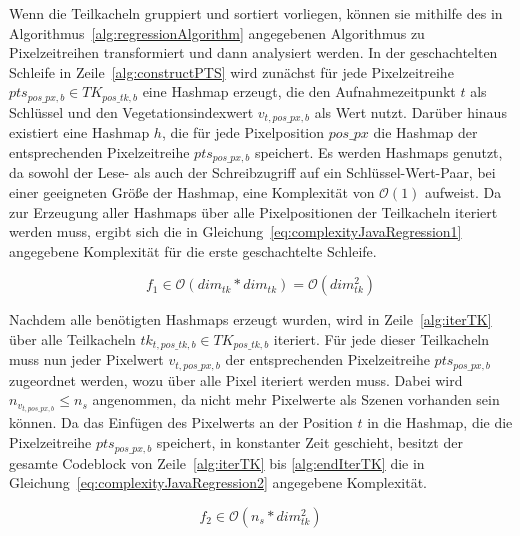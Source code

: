 Wenn die Teilkacheln gruppiert und sortiert vorliegen, können sie mithilfe des in Algorithmus~\ref{alg:regressionAlgorithm} angegebenen Algorithmus zu Pixelzeitreihen transformiert und dann analysiert werden. In der geschachtelten Schleife in Zeile~\ref{alg:constructPTS} wird zunächst für jede Pixelzeitreihe $pts_{pos\_px, b} \in TK_{pos\_tk, b}$ eine Hashmap erzeugt, die den Aufnahmezeitpunkt $t$ als Schlüssel und den Vegetationsindexwert $v_{t, pos\_px, b}$ als Wert nutzt. Darüber hinaus existiert eine Hashmap $h$, die für jede Pixelposition $pos\_px$ die Hashmap der entsprechenden Pixelzeitreihe $pts_{pos\_px, b}$ speichert. Es werden Hashmaps genutzt, da sowohl der Lese- als auch der Schreibzugriff auf ein Schlüssel-Wert-Paar, bei einer geeigneten Größe der Hashmap, eine Komplexität von $\mathcal{O}(1)$ aufweist. Da zur Erzeugung aller Hashmaps über alle Pixelpositionen der Teilkacheln iteriert werden muss, ergibt sich die in Gleichung~\ref{eq:complexityJavaRegression1} angegebene Komplexität für die erste geschachtelte Schleife. 

\begin{equation} \label{eq:complexityJavaRegression1}
f_1 \in \mathcal{O}(dim_{tk} * dim_{tk}) = \mathcal{O}(dim_{tk}^2)
\end{equation}

Nachdem alle benötigten Hashmaps erzeugt wurden, wird in Zeile~\ref{alg:iterTK} über alle Teilkacheln $tk_{t, pos\_{tk}, b} \in TK_{pos\_{tk}, b}$ iteriert. Für jede dieser Teilkacheln muss nun jeder Pixelwert $v_{t, pos\_px, b}$ der entsprechenden Pixelzeitreihe $pts_{pos\_px, b}$ zugeordnet werden, wozu über alle Pixel iteriert werden muss. Dabei wird $n_{v_{t, pos\_px, b}} \leq n_s$ angenommen, da nicht mehr Pixelwerte als Szenen vorhanden sein können. Da das Einfügen des Pixelwerts an der Position $t$ in die Hashmap, die die Pixelzeitreihe $pts_{pos\_px, b}$ speichert, in konstanter Zeit geschieht, besitzt der gesamte Codeblock von Zeile~\ref{alg:iterTK} bis \ref{alg:endIterTK} die in Gleichung~\ref{eq:complexityJavaRegression2} angegebene Komplexität.

\begin{equation} \label{eq:complexityJavaRegression2}
f_2 \in \mathcal{O}(n_{s} * dim_{tk}^2)
\end{equation}

